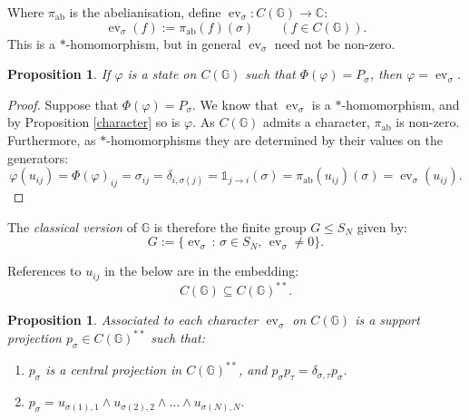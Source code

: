 \documentclass[12pt]{amsart}
\newtheorem{proposition}[theorem]{Proposition}
\theoremstyle{remark}
\theoremstyle{remark}
\begin{document}
Where $\pi_{\text{ab}}$ is the abelianisation, define $\operatorname{ev}_\sigma:C(\mathbb{G})\to \mathbb{C}$:
$$\operatorname{ev}_\sigma(f):=\pi_{\text{ab}}(f)(\sigma)\qquad (f\in C(\mathbb{G})).$$
This is a $\ast$-homomorphism, but in general  $\operatorname{ev}_\sigma$ need not be non-zero.
\begin{proposition}\label{charactertwo}
If $\varphi$ is a state on $C(\mathbb{G})$ such that $\Phi(\varphi)=P_\sigma$, then $\varphi=\operatorname{ev}_{\sigma}$.
\end{proposition}
\begin{proof}
Suppose that $\Phi(\varphi)=P_\sigma$. We know that $\operatorname{ev}_{\sigma}$ is a $\ast$-homomorphism, and by Proposition \ref{character} so is $\varphi$. As $C(\mathbb{G})$ admits a character, $\pi_{\text{ab}}$ is non-zero. Furthermore, as $\ast$-homomorphisms they are determined by their values on the generators:
$$\varphi(u_{ij})=\Phi(\varphi)_{ij}=\sigma_{ij}=\delta_{i,\sigma(j)}=\mathds{1}_{j\rightarrow i}(\sigma)=\pi_{\text{ab}}(u_{ij})(\sigma)=\operatorname{ev}_\sigma(u_{ij}).$$
\end{proof}
The \emph{classical version} of $\mathbb{G}$ is therefore the finite group $G\leq S_N$  given by:
$$G:=\{\operatorname{ev}_\sigma\,\colon\,\sigma\in S_N,\,\operatorname{ev}_\sigma\neq 0\}.$$


References to $u_{ij}$ in the below are in the embedding:
$$C(\mathbb{G})\subseteq C(\mathbb{G})^{**}.$$
\begin{proposition}\label{charsupport}
Associated to each character $\operatorname{ev}_\sigma$ on $C(\mathbb{G})$    is a \emph{support projection} $p_\sigma\in C(\mathbb{G})^{**}$ such that:
\begin{enumerate}
  \item[(i)] $p_{\sigma}$ is a central projection in $C(\mathbb{G})^{**}$, and $p_{\sigma}p_{\tau}=\delta_{\sigma,\tau}p_\sigma$.
  \item[(ii)]   $p_{\sigma}=u_{\sigma(1),1}\wedge u_{\sigma(2),2}\wedge\ldots\wedge u_{\sigma(N),N}.$

\end{enumerate}\end{proposition}
\end{document}
